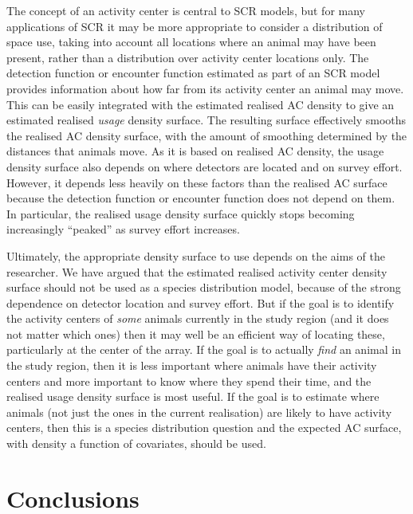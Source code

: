 \documentclass[10pt,a4paper]{article}
\begin{document}
The concept of an activity center is central to SCR models, but for many applications of SCR it may be more appropriate to consider a distribution of space use, taking into account all locations where an animal may have been present, rather than a distribution over activity center locations only. The detection function or encounter function estimated as part of an SCR model provides information about how far from its activity center an animal may move. This can be easily integrated with the estimated realised AC density to give an estimated realised {\it usage} density surface. The resulting surface effectively smooths the realised AC density surface, with the amount of smoothing determined by the distances that animals move. As it is based on realised AC density, the usage density surface also depends on where detectors are located and on survey effort. However, it depends less heavily on these factors than the realised AC surface because the detection function or encounter function does not depend on them. In particular, the realised usage density surface quickly stops becoming increasingly ``peaked'' as survey effort increases.

Ultimately, the appropriate density surface to use depends on the aims of the researcher. We have argued that the estimated realised activity center density surface should not be used as a species distribution model, because of the strong dependence on detector location and survey effort. But if the goal is to identify the activity centers of {\it some} animals currently in the study region (and it does not matter which ones) then it may well be an efficient way of locating these, particularly at the center of the array. If the goal is to actually {\it find} an animal in the study region, then it is less important where animals have their activity centers and more important to know where they spend their time, and the realised usage density surface is most useful. If the goal is to estimate where animals (not just the ones in the current realisation) are likely to have activity centers, then this is a species distribution question and the expected AC surface, with density a function of covariates, should be used.

\section{Conclusions}
\end{document}
